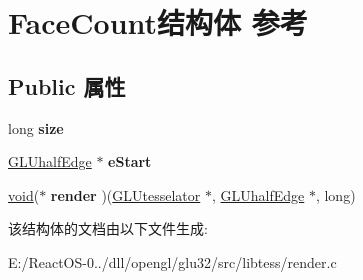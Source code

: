 \hypertarget{struct_face_count}{}\section{Face\+Count结构体 参考}
\label{struct_face_count}
\subsection*{Public 属性}
\begin{DoxyCompactItemize}
\item 
\mbox{\label{struct_face_count_a4927850804676296334915b9401f8cc7}} 
long {\bfseries size}
\item 
\mbox{\label{struct_face_count_ac61358343d9a2af4e9e6e4bc9fb55389}} 
\hyperlink{struct_g_l_uhalf_edge}{G\+L\+Uhalf\+Edge} $\ast$ {\bfseries e\+Start}
\item 
\mbox{\label{struct_face_count_ab7f6e5c284250b174a033c1359d3a65f}} 
\hyperlink{interfacevoid}{void}($\ast$ {\bfseries render} )(\hyperlink{struct_g_l_utesselator}{G\+L\+Utesselator} $\ast$, \hyperlink{struct_g_l_uhalf_edge}{G\+L\+Uhalf\+Edge} $\ast$, long)
\end{DoxyCompactItemize}


该结构体的文档由以下文件生成\+:\begin{DoxyCompactItemize}
\item 
E\+:/\+React\+O\+S-\/0../dll/opengl/glu32/src/libtess/render.\+c\end{DoxyCompactItemize}
